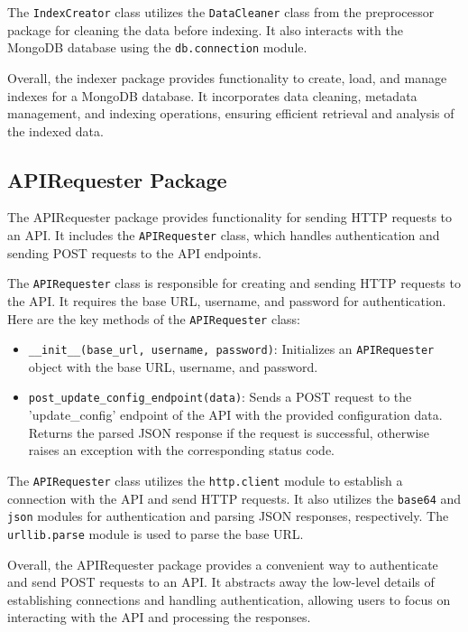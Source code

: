 \documentclass{article}
\begin{document}
The \texttt{IndexCreator} class utilizes the \texttt{DataCleaner} class from the preprocessor package for cleaning the data before indexing. It also interacts with the MongoDB database using the \texttt{db.connection} module.

Overall, the indexer package provides functionality to create, load, and manage indexes for a MongoDB database. It incorporates data cleaning, metadata management, and indexing operations, ensuring efficient retrieval and analysis of the indexed data.

\subsection{APIRequester Package}

The APIRequester package provides functionality for sending HTTP requests to an API. It includes the \texttt{APIRequester} class, which handles authentication and sending POST requests to the API endpoints.


The \texttt{APIRequester} class is responsible for creating and sending HTTP requests to the API. It requires the base URL, username, and password for authentication. Here are the key methods of the \texttt{APIRequester} class:

\begin{itemize}
    \item \texttt{\_\_init\_\_(base\_url, username, password)}: Initializes an \texttt{APIRequester} object with the base URL, username, and password.
    \item \texttt{post\_update\_config\_endpoint(data)}: Sends a POST request to the 'update\_config' endpoint of the API with the provided configuration data. Returns the parsed JSON response if the request is successful, otherwise raises an exception with the corresponding status code.
\end{itemize}

The \texttt{APIRequester} class utilizes the \texttt{http.client} module to establish a connection with the API and send HTTP requests. It also utilizes the \texttt{base64} and \texttt{json} modules for authentication and parsing JSON responses, respectively. The \texttt{urllib.parse} module is used to parse the base URL.

Overall, the APIRequester package provides a convenient way to authenticate and send POST requests to an API. It abstracts away the low-level details of establishing connections and handling authentication, allowing users to focus on interacting with the API and processing the responses.
\end{document}
